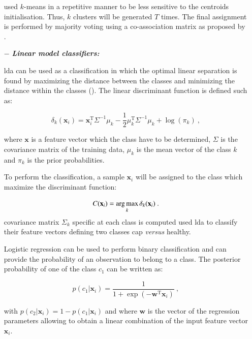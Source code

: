 \begin{enumerate}[leftmargin=*]
\cite{Tiwari2008,Viswanath2008,Viswanath2008a} used $k$-means in a repetitive manner to be less sensitive to the centroids initialisation. Thus, $k$ clusters will be generated $T$ times. The final assignment is performed by majority voting using a co-association matrix as proposed by \cite{Fred2005}.

\item[$-$] \textbf{\textit{Linear model classifiers:}} 

\Acf{lda} can be used as a classification in which the optimal linear separation is found by maximizing the distance between the classes and minimizing the distance within the classes (\cite{Friedman1989}). The linear discriminant function is defined such as:

\begin{equation}
	\delta_{k}(\mathbf{x}_i) = \mathbf{x}_i^{\text{T}} \Sigma^{-1} \mu_k - \frac{1}{2} \mu_{k}^{\text{T}} \Sigma^{-1} \mu_k + \log (\pi_k) \ ,
	\label{eq:ldafun}
\end{equation}

\noindent where $\mathbf{x}$ is a feature vector which the class have to be determined, $\Sigma$ is the covariance matrix of the training data, $\mu_k$ is the mean vector of the class $k$ and $\pi_k$ is the prior probabilities.

To perform the classification, a sample $\mathbf{x}_i$ will be assigned to the class which maximize the discriminant function:

\begin{equation}
	C(\mathbf{x}_i) = \operatorname*{arg\,max}_k \delta_k(\mathbf{x}_i) \ .
	\label{eq:ldaclass}
\end{equation}
covariance matrix $\Sigma_k$ specific at each class is computed
\cite{Antic2013,Chan2003,Niaf2011,Niaf2012,Vos2012} used \ac{lda} to classify their feature vectors defining two classes \ac{cap} \textit{versus} healthy.

Logistic regression can be used to perform binary classification and can provide the probability of an observation to belong to a class. The posterior probability of one of the class $c_1$ can be written as:

\begin{equation}
	p(c_1|\mathbf{x}_i) = \frac{1}{1+\exp(-\mathbf{w}^{\text{T}}\mathbf{x}_i)} \ ,
	\label{eq:postprlr}
\end{equation}

\noindent with $p(c_2|\mathbf{x}_i) = 1 - p(c_1|\mathbf{x}_i)$ and where $\mathbf{w}$ is the vector of the regression parameters allowing to obtain a linear combination of the input feature vector $\mathbf{x}_i$.


\end{enumerate}
